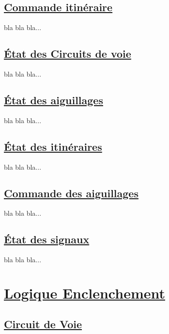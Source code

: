 \subsection{\underline{Commande itinéraire}}
\label{sec:ixl_iti}

bla bla bla...

\subsection{\underline{\'Etat des Circuits de voie}}
\label{sec:ixl_cdv}

bla bla bla...

\subsection{\underline{\'Etat des aiguillages}}
\label{sec:ixl_aig}

bla bla bla...

\subsection{\underline{\'Etat des itinéraires}}
\label{sec:st_iti}

bla bla bla...


\subsection{\underline{Commande des aiguillages}}
\label{sec:cmd_aig}

bla bla bla...

\subsection{\underline{\'Etat des signaux}}
\label{sec:st_sig}

bla bla bla...
  







\newpage
\section{\underline{Logique Enclenchement}}
\label{sec:log_enc}

\subsection{\underline{Circuit de Voie}}
\label{sec:CdV}

